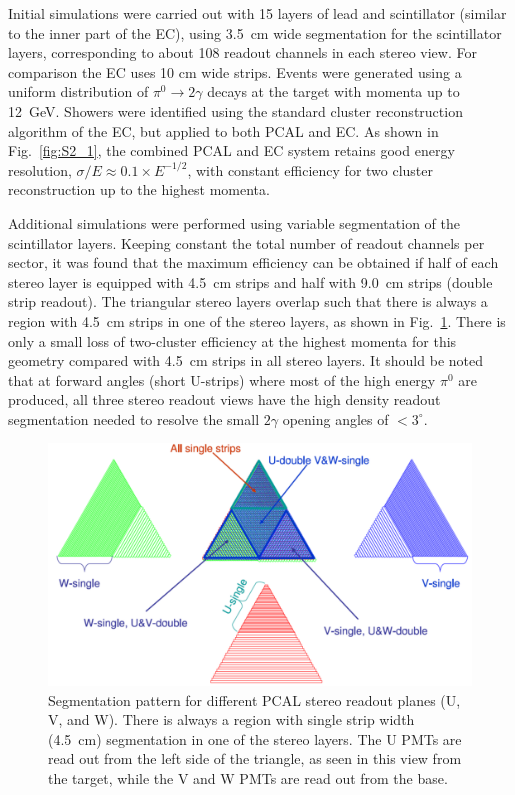 Initial simulations were carried out with 15 layers of lead and scintillator (similar to the inner part of the EC),
using 3.5~cm wide segmentation for the scintillator layers, corresponding to about 108 readout channels in each
stereo view. For comparison the EC uses 10 cm wide strips. Events were generated using a uniform distribution
of $\pi^{0}\rightarrow 2\gamma$ decays at the target with momenta up to 12~GeV. Showers were identified
using the standard cluster reconstruction algorithm of the EC, but applied to both PCAL and EC. As shown in
Fig.~\ref{fig:S2_1}, the combined PCAL and EC system retains good energy resolution,
$\sigma/E \approx 0.1 \times E^{-1/2}$, with constant efficiency for two cluster reconstruction up to the highest
momenta.

Additional simulations were performed using variable segmentation of the scintillator layers. Keeping constant
the total number of readout channels per sector, it was found that the maximum efficiency can be obtained if half
of each stereo layer is equipped with 4.5~cm strips and half with 9.0~cm strips (double strip readout). The triangular
stereo layers overlap such that there is always a region with 4.5~cm strips in one of the stereo layers, as shown in
Fig.~\ref{fig:S2_2}. There is only a small loss of two-cluster efficiency at the highest momenta for this geometry
compared with 4.5~cm strips in all stereo layers. It should be noted that at forward angles (short U-strips) where
most of the high energy $\pi^{0}$ are produced, all three stereo readout views have the high density readout
segmentation needed to resolve the small $2\gamma$ opening angles of $<3^{\circ}$.

\begin{figure}[hbt]
\centering
\includegraphics[width=0.95\columnwidth,keepaspectratio]{img/S2_2.png}
\caption{Segmentation pattern for different PCAL stereo readout planes (U, V, and W). There is always a region
  with single strip width (4.5~cm) segmentation in one of the stereo layers. The U PMTs are read out from the
  left side of the triangle, as seen in this view from the target, while the V and W PMTs are read out from the base.}
\label{fig:S2_2}
\end{figure}



